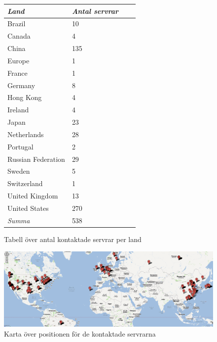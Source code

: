 \documentclass[a4paper]{article}
\begin{document}
\begin{figure}[h]
    \centering
    \begin{tabular}{ | l | l | l | p{5cm} |}
    \hline
    \emph{Land} & \emph{Antal servrar} \\ \hline
    Brazil  &   10 \\ \hline
    Canada  &   4 \\ \hline
    China   &   135 \\ \hline
    Europe  &   1 \\ \hline
    France  &   1 \\ \hline
    Germany &   8 \\ \hline
    Hong Kong   &   4 \\ \hline
    Ireland &   4 \\ \hline
    Japan   &   23 \\ \hline
    Netherlands &   28 \\ \hline
    Portugal    &   2 \\ \hline
    Russian Federation  &   29 \\ \hline
    Sweden  &   5 \\ \hline
    Switzerland &   1 \\ \hline
    United Kingdom  &   13 \\ \hline
    United States   &   270 \\ \hline
    \hline
    \emph{Summa} & 538 \\ \hline
    \end{tabular}
    \caption{Tabell över antal kontaktade servrar per land}
    \label{tab:countries}
\end{figure}

\begin{figure}[h]
    \centering
    \includegraphics[keepaspectratio,width=\textwidth]{map}
    \caption{Karta över positionen för de kontaktade servrarna}
    \label{fig:map}
\end{figure}
\end{document}
